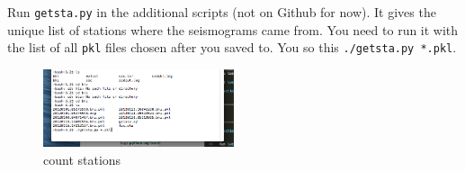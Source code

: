 \documentclass[letterpaper,10pt]{article}
\begin{document}
Run \verb"getsta.py" in the additional scripts (not on Github for now). It gives the unique list of stations where the seismograms came from. You need to run it with the list of all \verb"pkl" files chosen after you saved to. You so this \verb"./getsta.py *.pkl". 

\begin{figure}[h!]
  \centering
  \includegraphics[width=0.5\textwidth]{images/count_stations}
  \caption{count stations}
  \label{fig:count_stations}
\end{figure}
\end{document}
